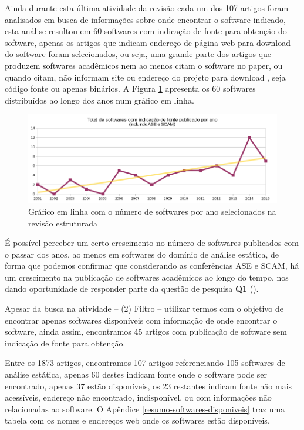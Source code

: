 Ainda durante esta última atividade da revisão cada um dos 107 artigos foram
analisados em busca de informações sobre onde encontrar o software indicado,
esta análise resultou em 60 softwares com indicação de fonte para obtenção do
software, apenas os artigos que indicam endereço de página web para download do
software foram selecionados, ou seja, uma grande parte dos artigos que produzem
softwares acadêmicos nem ao menos citam o software no paper, ou quando citam,
não informam site ou endereço do projeto para download
\cite{allen2017engineering}, seja código fonte ou apenas binários. A Figura
\ref{softwares-por-ano} apresenta os 60 softwares distribuídos ao longo dos
anos num gráfico em linha.

\begin{figure}[h]
  \center
  \includegraphics[scale=0.65]{imagens/softwares-por-ano.png}
  \caption{Gráfico em linha com o número de softwares por ano selecionados na revisão estruturada}
  \label{softwares-por-ano}
\end{figure}

É possível perceber um certo crescimento no número de softwares publicados com
o passar dos anos, ao menos em softwares do domínio de análise estática, de
forma que podemos confirmar que considerando as conferências ASE e SCAM, há um
crescimento na publicação de softwares acadêmicos ao longo do tempo, nos dando
oportunidade de responder parte da questão de pesquisa {\bf Q1} (\QuestaoUm).

Apesar da busca na atividade -- (2) Filtro -- utilizar termos com o objetivo de
encontrar apenas softwares disponíveis com informação de onde encontrar o
software, ainda assim, encontramos 45 artigos com publicação de software sem
indicação de fonte para obtenção.

Entre os 1873 artigos, encontramos 107 artigos referenciando 105 softwares de
análise estática, apenas 60 destes indicam fonte onde o software pode ser
encontrado, apenas 37 estão disponíveis, os 23 restantes indicam fonte não mais
acessíveis, endereço não encontrado, indisponível, ou com informações não
relacionadas ao software. O Apêndice \ref{resumo-softwares-disponiveis} traz
uma tabela com os nomes e endereços web onde os softwares estão disponíveis.

